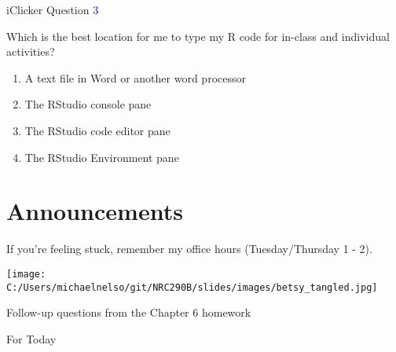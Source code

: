 \documentclass[ignorenonframetext,t]{beamer}
\begin{document}
\begin{frame}{iClicker Question \textcolor{blue}{3}}

Which is the best location for me to type my R code for in-class and
individual activities?

\begin{enumerate}[A]
\item A text file in Word or another word processor
\item The RStudio console pane
\item The RStudio code editor pane
\item The RStudio Environment pane
\end{enumerate}

\vfill


\end{frame}

\section{Announcements}\label{announcements}

If you're feeling stuck, remember my office hours (Tuesday/Thursday 1 -
2).

\begin{center}
\texttt{[image: C:/Users/michaelnelso/git/NRC290B/slides/images/betsy\_tangled.jpg]}
\end{center}

\begin{frame}{Follow-up questions from the Chapter 6 homework}

\end{frame}

\begin{frame}{For Today}

\end{frame}
\end{document}

